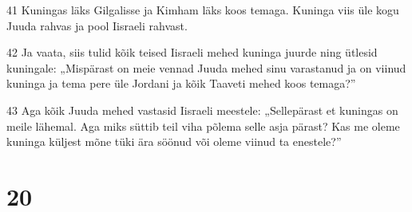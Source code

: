 \par 41 Kuningas läks Gilgalisse ja Kimham läks koos temaga. Kuninga viis üle kogu Juuda rahvas ja pool Iisraeli rahvast.
\par 42 Ja vaata, siis tulid kõik teised Iisraeli mehed kuninga juurde ning ütlesid kuningale: „Mispärast on meie vennad Juuda mehed sinu varastanud ja on viinud kuninga ja tema pere üle Jordani ja kõik Taaveti mehed koos temaga?”
\par 43 Aga kõik Juuda mehed vastasid Iisraeli meestele: „Sellepärast et kuningas on meile lähemal. Aga miks süttib teil viha põlema selle asja pärast? Kas me oleme kuninga küljest mõne tüki ära söönud või oleme viinud ta enestele?”

\chapter{20}

